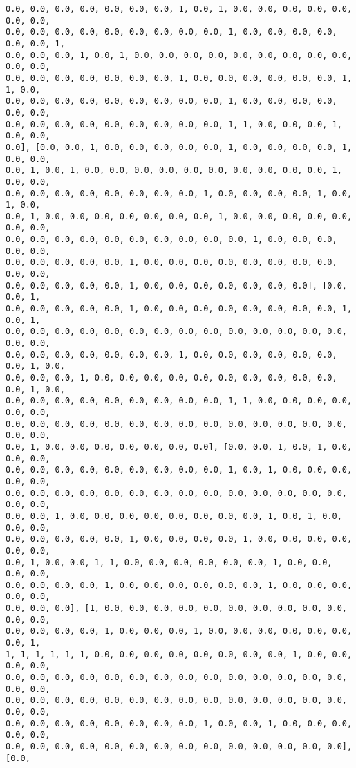 \documentclass[11pt]{article}
\begin{document}
\begin{Verbatim}[commandchars=\\\{\}]
0.0, 0.0, 0.0, 0.0, 0.0, 0.0, 0.0, 1, 0.0, 1, 0.0, 0.0, 0.0, 0.0, 0.0, 0.0, 0.0,
0.0, 0.0, 0.0, 0.0, 0.0, 0.0, 0.0, 0.0, 0.0, 1, 0.0, 0.0, 0.0, 0.0, 0.0, 0.0, 1,
0.0, 0.0, 0.0, 1, 0.0, 1, 0.0, 0.0, 0.0, 0.0, 0.0, 0.0, 0.0, 0.0, 0.0, 0.0, 0.0,
0.0, 0.0, 0.0, 0.0, 0.0, 0.0, 0.0, 1, 0.0, 0.0, 0.0, 0.0, 0.0, 0.0, 1, 1, 0.0,
0.0, 0.0, 0.0, 0.0, 0.0, 0.0, 0.0, 0.0, 0.0, 1, 0.0, 0.0, 0.0, 0.0, 0.0, 0.0,
0.0, 0.0, 0.0, 0.0, 0.0, 0.0, 0.0, 0.0, 0.0, 1, 1, 0.0, 0.0, 0.0, 1, 0.0, 0.0,
0.0], [0.0, 0.0, 1, 0.0, 0.0, 0.0, 0.0, 0.0, 1, 0.0, 0.0, 0.0, 0.0, 1, 0.0, 0.0,
0.0, 1, 0.0, 1, 0.0, 0.0, 0.0, 0.0, 0.0, 0.0, 0.0, 0.0, 0.0, 0.0, 1, 0.0, 0.0,
0.0, 0.0, 0.0, 0.0, 0.0, 0.0, 0.0, 0.0, 1, 0.0, 0.0, 0.0, 0.0, 1, 0.0, 1, 0.0,
0.0, 1, 0.0, 0.0, 0.0, 0.0, 0.0, 0.0, 0.0, 1, 0.0, 0.0, 0.0, 0.0, 0.0, 0.0, 0.0,
0.0, 0.0, 0.0, 0.0, 0.0, 0.0, 0.0, 0.0, 0.0, 0.0, 1, 0.0, 0.0, 0.0, 0.0, 0.0,
0.0, 0.0, 0.0, 0.0, 0.0, 1, 0.0, 0.0, 0.0, 0.0, 0.0, 0.0, 0.0, 0.0, 0.0, 0.0,
0.0, 0.0, 0.0, 0.0, 0.0, 1, 0.0, 0.0, 0.0, 0.0, 0.0, 0.0, 0.0], [0.0, 0.0, 1,
0.0, 0.0, 0.0, 0.0, 0.0, 1, 0.0, 0.0, 0.0, 0.0, 0.0, 0.0, 0.0, 0.0, 1, 0.0, 1,
0.0, 0.0, 0.0, 0.0, 0.0, 0.0, 0.0, 0.0, 0.0, 0.0, 0.0, 0.0, 0.0, 0.0, 0.0, 0.0,
0.0, 0.0, 0.0, 0.0, 0.0, 0.0, 0.0, 1, 0.0, 0.0, 0.0, 0.0, 0.0, 0.0, 0.0, 1, 0.0,
0.0, 0.0, 0.0, 1, 0.0, 0.0, 0.0, 0.0, 0.0, 0.0, 0.0, 0.0, 0.0, 0.0, 0.0, 1, 0.0,
0.0, 0.0, 0.0, 0.0, 0.0, 0.0, 0.0, 0.0, 0.0, 1, 1, 0.0, 0.0, 0.0, 0.0, 0.0, 0.0,
0.0, 0.0, 0.0, 0.0, 0.0, 0.0, 0.0, 0.0, 0.0, 0.0, 0.0, 0.0, 0.0, 0.0, 0.0, 0.0,
0.0, 1, 0.0, 0.0, 0.0, 0.0, 0.0, 0.0, 0.0], [0.0, 0.0, 1, 0.0, 1, 0.0, 0.0, 0.0,
0.0, 0.0, 0.0, 0.0, 0.0, 0.0, 0.0, 0.0, 0.0, 1, 0.0, 1, 0.0, 0.0, 0.0, 0.0, 0.0,
0.0, 0.0, 0.0, 0.0, 0.0, 0.0, 0.0, 0.0, 0.0, 0.0, 0.0, 0.0, 0.0, 0.0, 0.0, 0.0,
0.0, 0.0, 1, 0.0, 0.0, 0.0, 0.0, 0.0, 0.0, 0.0, 0.0, 1, 0.0, 1, 0.0, 0.0, 0.0,
0.0, 0.0, 0.0, 0.0, 0.0, 1, 0.0, 0.0, 0.0, 0.0, 1, 0.0, 0.0, 0.0, 0.0, 0.0, 0.0,
0.0, 1, 0.0, 0.0, 1, 1, 0.0, 0.0, 0.0, 0.0, 0.0, 0.0, 1, 0.0, 0.0, 0.0, 0.0,
0.0, 0.0, 0.0, 0.0, 1, 0.0, 0.0, 0.0, 0.0, 0.0, 0.0, 1, 0.0, 0.0, 0.0, 0.0, 0.0,
0.0, 0.0, 0.0], [1, 0.0, 0.0, 0.0, 0.0, 0.0, 0.0, 0.0, 0.0, 0.0, 0.0, 0.0, 0.0,
0.0, 0.0, 0.0, 0.0, 1, 0.0, 0.0, 0.0, 1, 0.0, 0.0, 0.0, 0.0, 0.0, 0.0, 0.0, 1,
1, 1, 1, 1, 1, 1, 0.0, 0.0, 0.0, 0.0, 0.0, 0.0, 0.0, 0.0, 1, 0.0, 0.0, 0.0, 0.0,
0.0, 0.0, 0.0, 0.0, 0.0, 0.0, 0.0, 0.0, 0.0, 0.0, 0.0, 0.0, 0.0, 0.0, 0.0, 0.0,
0.0, 0.0, 0.0, 0.0, 0.0, 0.0, 0.0, 0.0, 0.0, 0.0, 0.0, 0.0, 0.0, 0.0, 0.0, 0.0,
0.0, 0.0, 0.0, 0.0, 0.0, 0.0, 0.0, 0.0, 1, 0.0, 0.0, 1, 0.0, 0.0, 0.0, 0.0, 0.0,
0.0, 0.0, 0.0, 0.0, 0.0, 0.0, 0.0, 0.0, 0.0, 0.0, 0.0, 0.0, 0.0, 0.0], [0.0,

\end{Verbatim}
\end{document}
